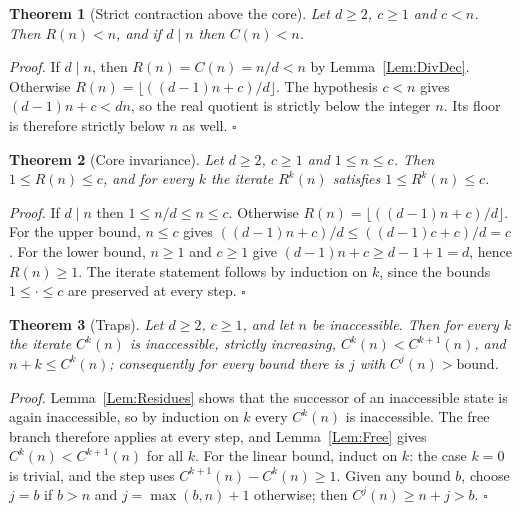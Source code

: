\documentclass[11pt,letterpaper]{article}
\newtheorem{theorem}{Theorem}
\newenvironment{proof}{\noindent\textit{Proof.}}{\hfill\(\square\)}
\begin{document}
\begin{theorem}[Strict contraction above the core]\label{Thm:Contract}
Let \(d\ge2\), \(c\ge1\) and \(c<n\). Then \(R(n)<n\), and if \(d\mid n\)
then \(C(n)<n\).
\end{theorem}

\begin{proof}
If \(d\mid n\), then \(R(n)=C(n)=n/d<n\) by
Lemma~\ref{Lem:DivDec}. Otherwise
\(R(n)=\lfloor((d-1)n+c)/d\rfloor\). The hypothesis \(c<n\) gives
\((d-1)n+c<dn\), so the real quotient is strictly below the integer \(n\).
Its floor is therefore strictly below \(n\) as well.
\end{proof}

\begin{theorem}[Core invariance]\label{Thm:Core}
Let \(d\ge2\), \(c\ge1\) and \(1\le n\le c\). Then \(1\le R(n)\le c\), and
for every \(k\) the iterate \(R^{k}(n)\) satisfies
\(1\le R^{k}(n)\le c\).
\end{theorem}

\begin{proof}
If \(d\mid n\) then \(1\le n/d\le n\le c\). Otherwise
\(R(n)=\lfloor((d-1)n+c)/d\rfloor\). For the upper bound, \(n\le c\) gives
\(((d-1)n+c)/d\le((d-1)c+c)/d=c\). For the lower bound, \(n\ge1\) and
\(c\ge1\) give \((d-1)n+c\ge d-1+1=d\), hence \(R(n)\ge1\). The iterate
statement follows by induction on \(k\), since the bounds \(1\le\cdot\le c\)
are preserved at every step.
\end{proof}

\begin{theorem}[Traps]\label{Thm:Trap}
Let \(d\ge2\), \(c\ge1\), and let \(n\) be inaccessible. Then for every
\(k\) the iterate \(C^{k}(n)\) is inaccessible, strictly increasing,
\(C^{k}(n)<C^{k+1}(n)\), and \(n+k\le C^{k}(n)\); consequently for every
bound there is \(j\) with \(C^{j}(n)>\text{bound}\).
\end{theorem}

\begin{proof}
Lemma~\ref{Lem:Residues} shows that the successor of an inaccessible state is
again inaccessible, so by induction on \(k\) every \(C^{k}(n)\) is
inaccessible. The free branch therefore applies at every step, and
Lemma~\ref{Lem:Free} gives \(C^{k}(n)<C^{k+1}(n)\) for all \(k\). For the
linear bound, induct on \(k\): the case \(k=0\) is trivial, and the step uses
\(C^{k+1}(n)-C^{k}(n)\ge1\). Given any bound \(b\), choose \(j=b\) if
\(b>n\) and \(j=\max(b,n)+1\) otherwise; then \(C^{j}(n)\ge n+j>b\).
\end{proof}
\end{document}
